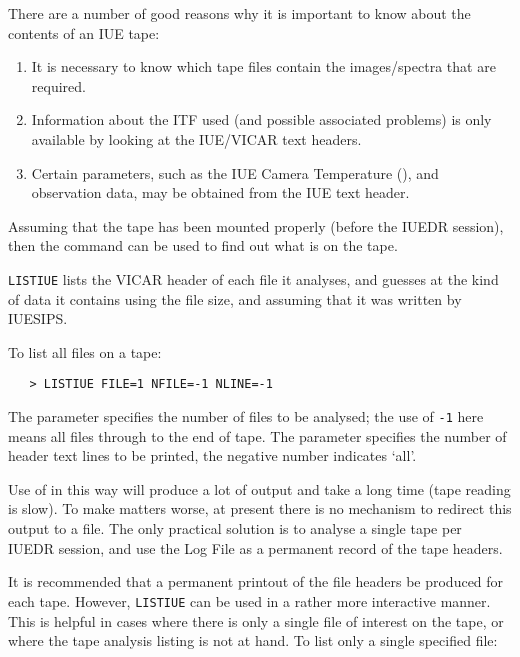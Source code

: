 There are a number of good reasons why it is important to know about the
contents of an IUE tape:

\begin{enumerate}

\item It is necessary to know which tape files contain the
      images/spectra that are required.

\item Information about the ITF used (and possible associated problems)
      is only available by looking at the IUE/VICAR text headers.

\item Certain parameters, such as the IUE Camera Temperature
      (), and
      observation data, may be obtained from the IUE text header.

\end{enumerate}

Assuming that the tape has been mounted properly (before the IUEDR
session), then the 
 command can be used to find out what is on the
tape.

\verb+LISTIUE+ lists the VICAR header of each file it analyses, and guesses at
the kind of data it contains using the file size, and assuming that it was
written by IUESIPS\@.

To list all files on a tape:

\begin{verbatim}
   > LISTIUE FILE=1 NFILE=-1 NLINE=-1
\end{verbatim}

The 
 parameter specifies the number of files to be analysed; the
use of \verb+-1+ here means all files through to the end of tape.  The
 parameter specifies the number of header text lines to be printed,
the negative number indicates `all'\@.

Use of 
 in this way will produce a lot of output and take a long
time (tape reading is slow)\@.
To make matters worse, at present there is no mechanism to redirect this
output to a file.  The only practical solution is to analyse a single tape per
IUEDR session, and use the Log File as a permanent record of the tape headers.

It is recommended that a permanent printout of the file headers be produced
for each tape.  However, \verb+LISTIUE+ can be used in a rather more interactive
manner.  This is helpful in cases where there is only a single file of
interest on the tape, or where the tape analysis listing is not at hand.  To
list only a single specified file:

